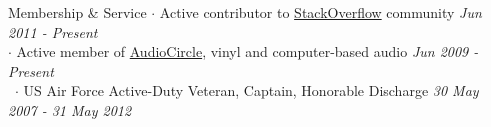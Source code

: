 
\begin{rSection}{Membership \& Service}
  $\cdot$ Active contributor to 
  \href{http://stackoverflow.com/users/822162/clayton-stanley}{StackOverflow}
  community \hfill {\em Jun 2011 - Present} \\
  $\cdot$ Active member of
  \href{http://audiocircle.com}{AudioCircle},
  vinyl and computer-based audio
  \hfill {\em Jun 2009 - Present} \\
  ~$\cdot$ US Air Force Active-Duty Veteran, Captain, Honorable Discharge
  \hfill {\em 30 May 2007 - 31 May 2012}
\end{rSection}

